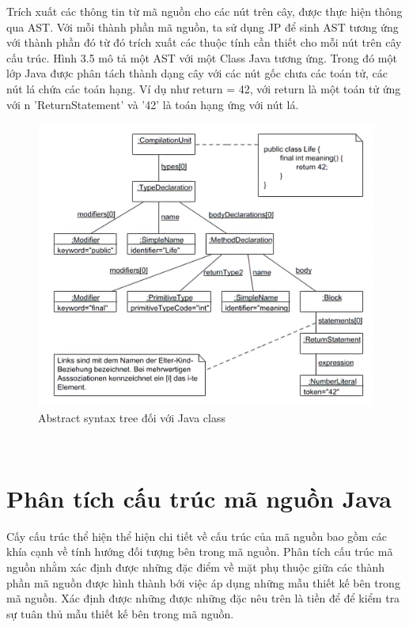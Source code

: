 \documentclass[12pt]{report}
\begin{document}
\newpage
Trích xuất các thông tin từ mã nguồn cho các nút trên cây, được thực hiện thông qua AST. Với mỗi thành phần mã nguồn, ta sử dụng JP để sinh AST tương ứng với thành phần đó từ đó trích xuất các thuộc tính cần thiết cho mỗi nút trên cây cấu trúc. Hình 3.5 mô tả một AST với một Class Java tương ứng. Trong đó một lớp Java được phân tách thành dạng cây với các nút gốc chưa các toán tử, các nút lá chứa các toán hạng. Ví dụ như return = 42, với return là một toán tử ứng với n 'ReturnStatement' và '42' là toán hạng ứng với nút lá.
\begin{figure}[h]
	\centering
	\includegraphics[scale=1]{images/ast_class_java-boring}
	\caption{Abstract syntax tree đối với Java class}
	\label{fig:ast_for_java_class}
\end{figure}\\

\newpage
\section{Phân tích cấu trúc mã nguồn Java}
Cấy cấu trúc thể hiện thể hiện chi tiết về cấu trúc của mã nguồn bao gồm các khía cạnh về tính hướng đối tượng bên trong mã nguồn. Phân tích cấu trúc mã nguồn nhằm xác định được những đặc điểm về mặt phụ thuộc giữa các thành phần mã nguồn được hình thành bới việc áp dụng những mẫu thiết kế bên trong mã nguồn. Xác định được những được những đặc nêu trên là tiền để để kiểm tra sự tuân thủ mẫu thiết kế bên trong mã nguồn.
\end{document}
